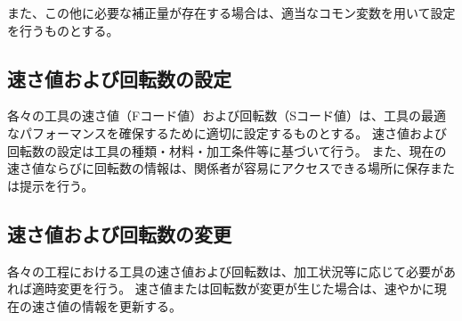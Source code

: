 また、この他に必要な補正量が存在する場合は、適当なコモン変数を用いて設定を行うものとする。




\subsection{速さ値および回転数の設定}
各々の工具の速さ値（Fコード値）および回転数（Sコード値）は、工具の最適なパフォーマンスを確保するために適切に設定するものとする。
速さ値および回転数の設定は工具の種類・材料・加工条件等に基づいて行う。
また、現在の速さ値ならびに回転数の情報は、関係者が容易にアクセスできる場所に保存または提示を行う。

\subsection{速さ値および回転数の変更}
各々の工程における工具の速さ値および回転数は、加工状況等に応じて必要があれば適時変更を行う。
速さ値または回転数が変更が生じた場合は、速やかに現在の速さ値の情報を更新する。

